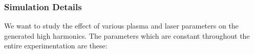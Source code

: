 \documentclass{beamer}
\begin{document}
\begin{frame}
    \frametitle{Simulation Details}
    \small
    We want to study the effect of various plasma and laser parameters on the generated high harmonics. The parameters which are constant throughout the entire experimentation are these:


\end{frame}
\end{document}
